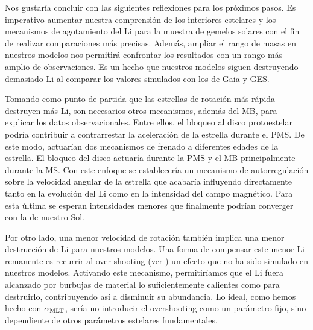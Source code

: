 Nos gustaría concluir con las siguientes reflexiones para los próximos pasos. Es imperativo aumentar nuestra comprensión de los interiores estelares y los mecanismos de agotamiento del Li para la muestra de gemelos solares con el fin de realizar comparaciones más precisas. Además, ampliar el rango de masas en nuestros modelos nos permitirá confrontar los resultados con un rango más amplio de observaciones. Es un hecho que nuestros modelos siguen destruyendo demasiado Li al comparar los valores simulados con los de Gaia y GES.\par 

Tomando como punto de partida que las estrellas de rotación más rápida destruyen más Li, son necesarios otros mecanismos, además del MB, para explicar los datos observacionales. Entre ellos, el bloqueo al disco protoestelar podría contribuir a contrarrestar la aceleración de la estrella durante el PMS. De este modo, actuarían dos mecanismos de frenado a diferentes edades de la estrella. El bloqueo del disco actuaría durante la PMS y el MB principalmente durante la MS. Con este enfoque se establecería un mecanismo de autorregulación sobre la velocidad angular de la estrella que acabaría influyendo directamente tanto en la evolución del Li como en la intensidad del campo magnético. Para esta última se esperan intensidades menores que finalmente podrían converger con la de nuestro Sol.\par

Por otro lado, una menor velocidad de rotación también implica una menor destrucción de Li para nuestros modelos. Una forma de compensar este menor Li remanente es recurrir al over-shooting (ver \cite{Caballero2020}) un efecto que no ha sido simulado en nuestros modelos. Activando este mecanismo, permitiríamos que el Li fuera alcanzado por burbujas de material lo suficientemente calientes como para destruirlo, contribuyendo así a disminuir su abundancia. Lo ideal, como hemos hecho con $\alpha_{\mathrm{MLT}}$, sería no introducir el overshooting como un parámetro fijo, sino dependiente de otros parámetros estelares fundamentales.\par


\endinput
